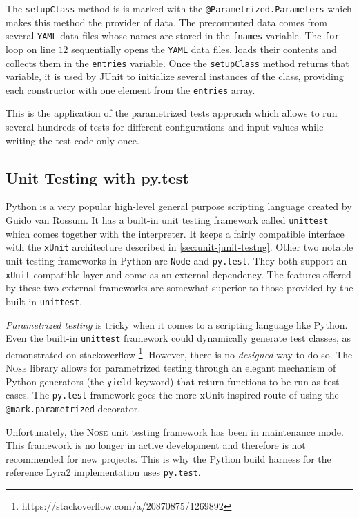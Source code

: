 The \texttt{setupClass} method is is marked with the \texttt{@Parametrized.Parameters} which makes this method the provider of data. The precomputed data comes from several \texttt{YAML} data files whose names are stored in the \texttt{fnames} variable. The \texttt{for} loop on line \(12\) sequentially opens the \texttt{YAML} data files, loads their contents and collects them in the \texttt{entries} variable. Once the \texttt{setupClass} method returns that variable, it is used by JUnit to initialize several instances of the class, providing each constructor with one element from the \texttt{entries} array.

This is the application of the parametrized tests approach which allows to run several hundreds of tests for different configurations and input values while writing the test code only once.

\subsection{Unit Testing with py.test}
\label{sec:unit-pytest}

Python is a very popular high-level general purpose scripting language created by Guido van Rossum. It has a built-in unit testing framework called \texttt{unittest} which comes together with the interpreter. It keeps a fairly compatible interface with the \texttt{xUnit} architecture described in \ref{sec:unit-junit-testng}. Other two notable unit testing frameworks in Python are \texttt{Node} and \texttt{py.test}. They both support an \texttt{xUnit} compatible layer and come as an external dependency. The features offered by these two external frameworks are somewhat superior to those provided by the built-in \texttt{unittest}.

\emph{Parametrized testing} is tricky when it comes to a scripting language like Python. Even the built-in \texttt{unittest} framework could dynamically generate test classes, as demonstrated on stackoverflow \footnote{https://stackoverflow.com/a/20870875/1269892}. However, there is no \emph{designed} way to do so. The \textsc{Nose} library allows for parametrized testing through an elegant mechanism of Python generators (the \texttt{yield} keyword) that return functions to be run as test cases. The \texttt{py.test} framework goes the more xUnit-inspired route of using the \texttt{@mark.parametrized} decorator.

Unfortunately, the \textsc{Nose} unit testing framework has been in maintenance mode. This framework is no longer in active development and therefore is not recommended for new projects. This is why the Python build harness for the reference Lyra2 implementation uses \texttt{py.test}.

